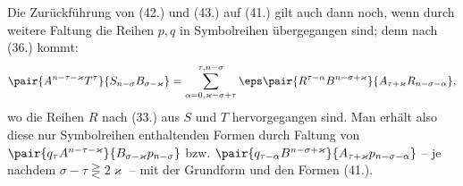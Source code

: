 Die Zur\"uckf\"uhrung von (42.) und (43.) auf (41.) gilt auch dann noch, wenn durch weitere Faltung die Reihen $p,q$ in Symbolreihen \"ubergegangen sind; denn nach (36.) kommt:
\[
 \pair{A^{n-\tau-\varkappa}T^\tau}{S_{n-\sigma}B_{\sigma-\varkappa}}
 =\sum_{\alpha=0,\varkappa-\sigma+\tau}^{\tau,n-\sigma}
 \eps\pair{R^{\tau-\alpha}B^{n-\sigma+\varkappa}}{A_{\tau+\varkappa}R_{n-\sigma-\alpha}},
\]
wo die Reihen $R$ nach (33.) aus $S$ und $T$ hervorgegangen sind. Man erh\"alt also diese nur Symbolreihen enthaltenden Formen durch Faltung von $\pair{q_\tau A^{n-\tau-\varkappa}}{B_{\sigma-\varkappa}p_{n-\sigma}}$ bzw. $\pair{q_{\tau-\alpha}B^{n-\sigma+\varkappa}}{A_{\tau+\varkappa}p_{n-\sigma-\alpha}}$ -- je nachdem $\sigma-\tau\gtreqless 2\varkappa$ -- mit der Grundform und den Formen (41.).
